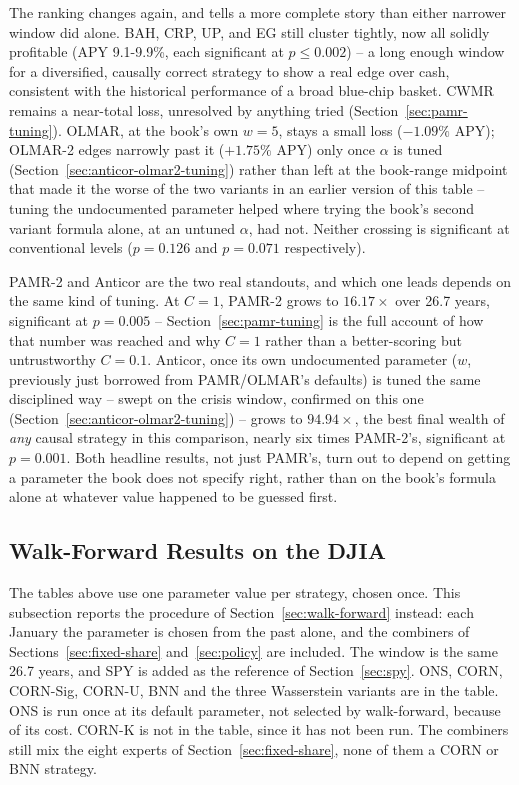 \documentclass[11pt]{article}
\begin{document}
The ranking changes again, and tells a more complete story than either
narrower window did alone. BAH, CRP, UP, and EG still cluster tightly,
now all solidly profitable (APY 9.1-9.9\%, each significant at
$p \leq 0.002$) -- a long enough window for a diversified, causally
correct strategy to show a real edge over cash, consistent with the
historical performance of a broad blue-chip basket. CWMR remains a
near-total loss, unresolved by anything tried (Section~\ref{sec:pamr-tuning}).
OLMAR, at the book's own $w=5$, stays a small loss ($-1.09\%$ APY);
OLMAR-2 edges narrowly past it ($+1.75\%$ APY) only once $\alpha$ is
tuned (Section~\ref{sec:anticor-olmar2-tuning}) rather than left at the
book-range midpoint that made it the worse of the two variants in an
earlier version of this table -- tuning the undocumented parameter
helped where trying the book's second variant formula alone, at an
untuned $\alpha$, had not. Neither crossing is significant at
conventional levels ($p=0.126$ and $p=0.071$ respectively).

PAMR-2 and Anticor are the two real standouts, and which one leads
depends on the same kind of tuning. At $C=1$, PAMR-2 grows to
$16.17\times$ over 26.7 years, significant at $p=0.005$ --
Section~\ref{sec:pamr-tuning} is the full account of how that number
was reached and why $C=1$ rather than a better-scoring but untrustworthy
$C=0.1$. Anticor, once its own undocumented parameter ($w$, previously
just borrowed from PAMR/OLMAR's defaults) is tuned the same disciplined
way -- swept on the crisis window, confirmed on this one
(Section~\ref{sec:anticor-olmar2-tuning}) -- grows to $94.94\times$,
the best final wealth of \emph{any} causal strategy in this comparison,
nearly six times PAMR-2's, significant at $p=0.001$. Both headline
results, not just PAMR's, turn out to depend on getting a parameter the
book does not specify right, rather than on the book's formula alone at
whatever value happened to be guessed first.

\subsection{Walk-Forward Results on the DJIA}
\label{sec:wf-djia}

The tables above use one parameter value per strategy, chosen once. This
subsection reports the procedure of Section~\ref{sec:walk-forward}
instead: each January the parameter is chosen from the past alone, and the
combiners of Sections~\ref{sec:fixed-share} and~\ref{sec:policy} are
included. The window is the same 26.7 years, and SPY is added as the
reference of Section~\ref{sec:spy}. ONS, CORN, CORN-Sig, CORN-U, BNN and
the three Wasserstein variants are in the table. ONS is run once at its
default parameter, not selected by walk-forward, because of its cost.
CORN-K is not in the table, since it has not been run. The
combiners still mix the eight experts of Section~\ref{sec:fixed-share},
none of them a CORN or BNN strategy.
\end{document}
